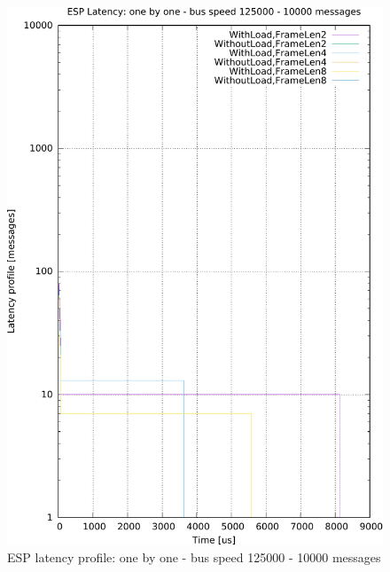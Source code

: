 \documentclass{ctuthesis}
\begin{document}
\begin{figure}[htb]
\includegraphics[width=\linewidth]{figures/speed125000_messages10000_floodFalse.pdf}
\caption{ESP latency profile: one by one - bus speed 125000 - 10000 messages}
\end{figure}
\end{document}
